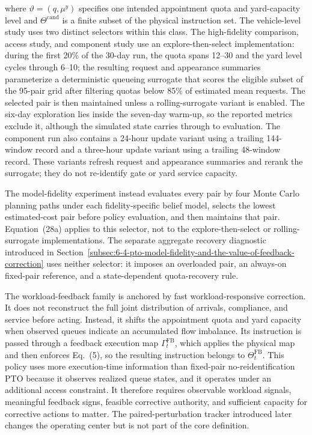 \documentclass[preprint,12pt,authoryear,a4paper]{elsarticle}
\begin{document}
where \(\vartheta=(q,\mu^y)\) specifies one intended appointment quota and yard-capacity level and \(\Theta^{\mathrm{cand}}\) is a finite subset of the physical instruction set. The vehicle-level study uses two distinct selectors within this class. The high-fidelity comparison, access study, and component study use an explore-then-select implementation: during the first 20\% of the 30-day run, the quota spans 12--30 and the yard level cycles through 6--10; the resulting request and appearance summaries parameterize a deterministic queueing surrogate that scores the eligible subset of the 95-pair grid after filtering quotas below 85\% of estimated mean requests. The selected pair is then maintained unless a rolling-surrogate variant is enabled. The six-day exploration lies inside the seven-day warm-up, so the reported metrics exclude it, although the simulated state carries through to evaluation. The component run also contains a 24-hour update variant using a trailing 144-window record and a three-hour update variant using a trailing 48-window record. These variants refresh request and appearance summaries and rerank the surrogate; they do not re-identify gate or yard service capacity.

The model-fidelity experiment instead evaluates every pair by four Monte Carlo planning paths under each fidelity-specific belief model, selects the lowest estimated-cost pair before policy evaluation, and then maintains that pair. Equation~(28a) applies to this selector, not to the explore-then-select or rolling-surrogate implementations. The separate aggregate recovery diagnostic introduced in Section~\ref{subsec:6-4-pto-model-fidelity-and-the-value-of-feedback-correction} uses neither selector: it imposes an overloaded pair, an always-on fixed-pair reference, and a state-dependent quota-recovery rule.

The workload-feedback family is anchored by fast workload-responsive correction. It does not reconstruct the full joint distribution of arrivals, compliance, and service before acting. Instead, it shifts the appointment quota and yard capacity when observed queues indicate an accumulated flow imbalance. Its instruction is passed through a feedback execution map \(\Gamma_t^{\mathrm{FB}}\), which applies the physical map and then enforces Eq.~(5), so the resulting instruction belongs to \(\Theta_t^{\mathrm{FB}}\). This policy uses more execution-time information than fixed-pair no-reidentification PTO because it observes realized queue states, and it operates under an additional access constraint. It therefore requires observable workload signals, meaningful feedback signs, feasible corrective authority, and sufficient capacity for corrective actions to matter. The paired-perturbation tracker introduced later changes the operating center but is not part of the core definition.
\end{document}

